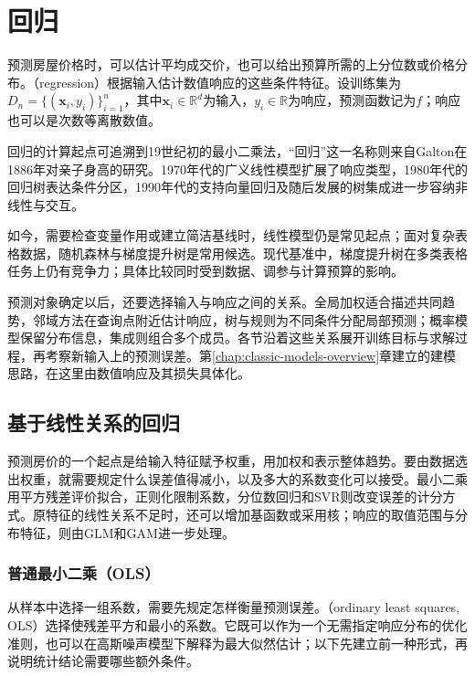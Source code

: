 \chapter{回归}
\label{chap:regression}

预测房屋价格时，可以估计平均成交价，也可以给出预算所需的上分位数或价格分布。（regression）根据输入估计数值响应的这些条件特征。设训练集为$D_n=\{(\bm{x}_i,y_i)\}_{i=1}^{n}$，其中$\bm{x}_i\in\mathbb{R}^{d}$为输入，$y_i\in\mathbb{R}$为响应，预测函数记为$f$；响应也可以是次数等离散数值。

回归的计算起点可追溯到19世纪初的最小二乘法，“回归”这一名称则来自Galton在1886年对亲子身高的研究。1970年代的广义线性模型扩展了响应类型，1980年代的回归树表达条件分区，1990年代的支持向量回归及随后发展的树集成进一步容纳非线性与交互。

如今，需要检查变量作用或建立简洁基线时，线性模型仍是常见起点；面对复杂表格数据，随机森林与梯度提升树是常用候选。现代基准中，梯度提升树在多类表格任务上仍有竞争力；具体比较同时受到数据、调参与计算预算的影响。

预测对象确定以后，还要选择输入与响应之间的关系。全局加权适合描述共同趋势，邻域方法在查询点附近估计响应，树与规则为不同条件分配局部预测；概率模型保留分布信息，集成则组合多个成员。各节沿着这些关系展开训练目标与求解过程，再考察新输入上的预测误差。第\ref{chap:classic-models-overview}章建立的建模思路，在这里由数值响应及其损失具体化。

\section{基于线性关系的回归}
\label{sec:regression-linear}

预测房价的一个起点是给输入特征赋予权重，用加权和表示整体趋势。要由数据选出权重，就需要规定什么误差值得减小，以及多大的系数变化可以接受。最小二乘用平方残差评价拟合，正则化限制系数，分位数回归和SVR则改变误差的计分方式。原特征的线性关系不足时，还可以增加基函数或采用核；响应的取值范围与分布特征，则由GLM和GAM进一步处理。

\subsection{普通最小二乘（OLS）}
\label{sec:regression-ols}

从样本中选择一组系数，需要先规定怎样衡量预测误差。（ordinary least squares, OLS）选择使残差平方和最小的系数。它既可以作为一个无需指定响应分布的优化准则，也可以在高斯噪声模型下解释为最大似然估计；以下先建立前一种形式，再说明统计结论需要哪些额外条件。

